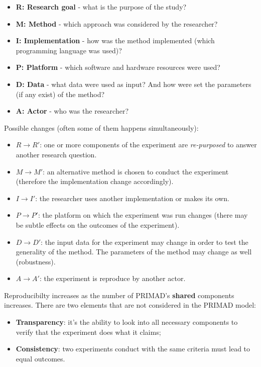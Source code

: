 \begin{itemize}
\item \textbf{R: Research goal} - what is the purpose of the study?
\item \textbf{M: Method} - which approach was considered by the researcher?
\item \textbf{I: Implementation} - how was the method implemented (which programming language was used)?
\item \textbf{P: Platform} - which software and hardware resources were used? 
\item \textbf{D: Data} - what data were used as input? And how were set the parameters (if any exist) of the method?
\item \textbf{A: Actor} - who was the researcher?
\end{itemize}

Possible changes (often some of them happens simultaneously):
\begin{itemize}
\item $R \rightarrow R'$: one or more components of the experiment are \textit{re-purposed} to answer another research question.
\item $M \rightarrow M'$: an alternative method is chosen to conduct the experiment (therefore the implementation change accordingly).
\item $I \rightarrow I'$: the researcher uses another implementation or makes its own.
\item $P \rightarrow P'$: the platform on which the experiment was run changes (there may be subtle effects on the outcomes of the experiment).
\item $D \rightarrow D'$: the input data for the experiment may change in order to test the generality of the method. The parameters of the method may change as well (robustness).
\item $A \rightarrow A'$: the experiment is reproduce by another actor.
\end{itemize}

Reproducibilty increases as the number of PRIMAD's \textbf{shared} components increases.
There are two elements that are not considered in the PRIMAD model:

\begin{itemize}
\item \textbf{Transparency}: it's the ability to look into all necessary components to verify that the experiment does what it claims;
\item \textbf{Consistency}: two experiments conduct with the same criteria must lead to equal outcomes.
\end{itemize}

